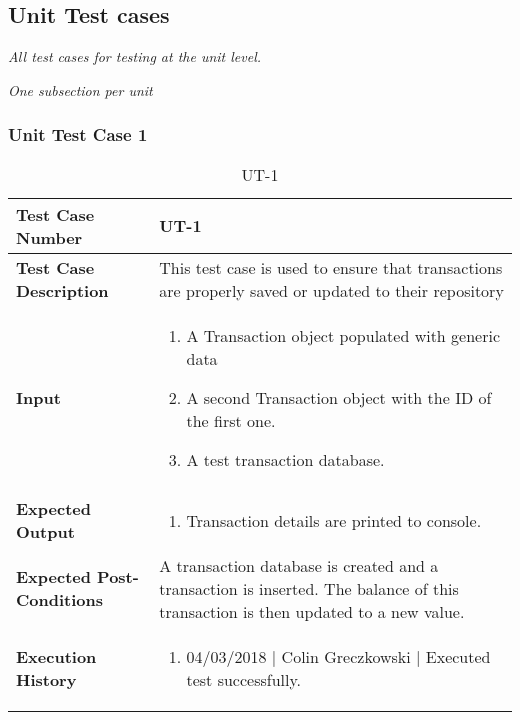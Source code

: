 \documentclass[12pt]{article}
\begin{document}
\subsection{Unit Test cases}

{\it
All test cases for testing at the unit level.
}

{\it
One subsection per unit
}


\subsubsection{Unit Test Case 1} \label{tc:1}
\def\arraystretch{1.5}%
\begin{table}[htbp]
\centering
\caption {UT-1}
\label{UT-1}
\begin{tabularx}{\textwidth}{ | l | X |}
\hline
\textbf{Test Case Number}      &  UT-1                         \\ \hline
\textbf{Test Case Description}    &  This test case is used to ensure that transactions are properly saved or updated to their repository                \\ \hline
\textbf{Input}         & 	\begin{enumerate}
	\item A Transaction object populated with generic data
          \item A second Transaction object with the ID of the first one.
	\item A test transaction database.
\end{enumerate} \\ \hline

\textbf{Expected Output}     & \begin{enumerate}
	\item Transaction details are printed to console.
\end{enumerate} \\ \hline
\textbf{Expected Post-Conditions}           &  A transaction database is created and a transaction is inserted. The balance of this transaction is then updated to a new value.                   \\ \hline
\textbf{Execution History}   &  \begin{enumerate}
	\item 04/03/2018 | Colin Greczkowski | Executed test successfully.
\end {enumerate} \\ \hline
\end{tabularx}
\end{table}
\clearpage
\end{document}
